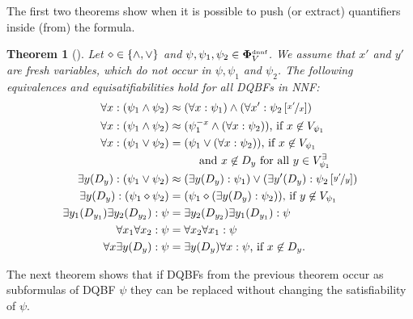 \documentclass[
  digital, %
  twoside, %
  table,   %
  nolof,     %
  nolot,     %
]{fithesis3}
\let\setbuilder\set
\newcommand{\simpleset}[1]{\{{#1}\}}
\renewcommand{\set}[1]{\normalexpandarg\IfSubStr{#1}{|}{\setbuilder{#1}}{\simpleset{#1}}}
\newtheorem{theorem}{Theorem}[chapter] %
\theoremstyle{definition}
\theoremstyle{remark}
\newcommand{\substitute}[2]{\left[ \nicefrac{#2}{#1} \right]}
\newcommand{\DQBF}[1]{\mathbf{\Phi}_{#1}^{\text{\tiny dnnf}}}
\newcommand{\evars}[1]{V_{#1}^{\exists}}
\begin{document}
The first two theorems show when it is possible to push (or extract) quantifiers inside (from) the formula. %

\begin{theorem}[{\cite[Theorem 3,4]{HQSquantifierLocalization}}]
  Let ${\diamond} \in \set{{\land},{\lor}}$ and $\psi,\psi_1,\psi_2 \in \DQBF{V}$. We assume that $x'$ and $y'$ are fresh variables, which do not occur in $\psi,\psi_1$ and $\psi_2$. The following equivalences and equisatifiabilities hold for all DQBFs in NNF:
  \begin{align}
      \forall x : (\psi_1 \land \psi_2) &\approx (\forall x : \psi_1) \land (\forall x' : \psi_2\substitute{x}{x'}) \\
      \forall x : (\psi_1 \land \psi_2) &\approx (\psi_1^{-x} \land (\forall x : \psi_2)) \text{, if } x \not\in V_{\psi_1} \\
      \forall x : (\psi_1 \lor \psi_2) &= \begin{multlined}[t][3cm](\psi_1 \lor (\forall x : \psi_2)) \text{, if } x \not\in V_{\psi_1}\\
      \text{ and } x \not\in D_y \text{ for all } y \in \evars{\psi_1}\end{multlined} \\
      \exists y(D_y) : (\psi_1 \lor \psi_2) &\approx (\exists y(D_y) : \psi_1) \lor (\exists y'(D_y) : \psi_2\substitute{y}{y'}) \\
      \exists y(D_y) : (\psi_1 \diamond \psi_2) &= (\psi_1 \diamond (\exists y(D_y) : \psi_2)) \text{, if } y \not\in V_{\psi_1} \\
      \exists y_1(D_{y_1})\exists y_2(D_{y_2}) : \psi &= \exists y_2(D_{y_2}) \exists y_1(D_{y_1}) : \psi \\
      \forall x_1\forall x_2 : \psi &= \forall x_2\forall x_1 : \psi \\
      \forall x\exists y(D_y) : \psi &= \exists y(D_y)\forall x : \psi\text{, if } x \not\in D_y.
  \end{align}
\end{theorem}

The next theorem shows that if DQBFs from the previous theorem occur as subformulas of DQBF $\psi$ they can be replaced without changing the satisfiability of $\psi$.
\end{document}
